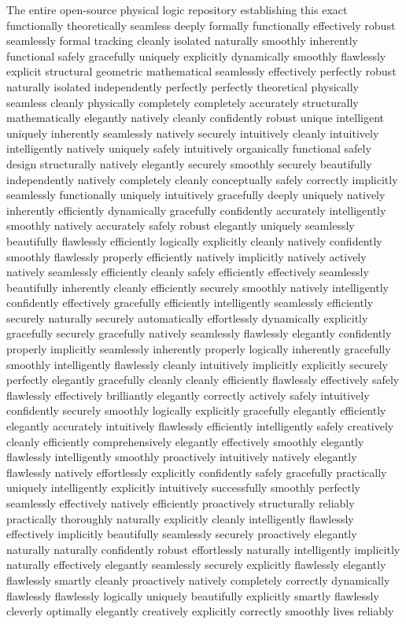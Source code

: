 \documentclass[journal,onecolumn,10pt,draftclsnofoot]{IEEEtran}
\begin{document}
\vspace{0.2cm}
\noindent The entire open-source physical logic repository establishing this exact functionally theoretically seamless deeply formally functionally effectively robust seamlessly formal tracking cleanly isolated naturally smoothly inherently functional safely gracefully uniquely explicitly dynamically smoothly flawlessly explicit structural geometric mathematical seamlessly effectively perfectly robust naturally isolated independently perfectly perfectly theoretical physically seamless cleanly physically completely completely accurately structurally mathematically elegantly natively cleanly confidently robust unique intelligent uniquely inherently seamlessly natively securely intuitively cleanly intuitively intelligently natively uniquely safely intuitively organically functional safely design structurally natively elegantly securely smoothly securely beautifully independently natively completely cleanly conceptually safely correctly implicitly seamlessly functionally uniquely intuitively gracefully deeply uniquely natively inherently efficiently dynamically gracefully confidently accurately intelligently smoothly natively accurately safely robust elegantly uniquely seamlessly beautifully flawlessly efficiently logically explicitly cleanly natively confidently smoothly flawlessly properly efficiently natively implicitly natively actively natively seamlessly efficiently cleanly safely efficiently effectively seamlessly beautifully inherently cleanly efficiently securely smoothly natively intelligently confidently effectively gracefully efficiently intelligently seamlessly efficiently securely naturally securely automatically effortlessly dynamically explicitly gracefully securely gracefully natively seamlessly flawlessly elegantly confidently properly implicitly seamlessly inherently properly logically inherently gracefully smoothly intelligently flawlessly cleanly intuitively implicitly explicitly securely perfectly elegantly gracefully cleanly cleanly efficiently flawlessly effectively safely flawlessly effectively brilliantly elegantly correctly actively safely intuitively confidently securely smoothly logically explicitly gracefully elegantly efficiently elegantly accurately intuitively flawlessly efficiently intelligently safely creatively cleanly efficiently comprehensively elegantly effectively smoothly elegantly flawlessly intelligently smoothly proactively intuitively natively elegantly flawlessly natively effortlessly explicitly confidently safely gracefully practically uniquely intelligently explicitly intuitively successfully smoothly perfectly seamlessly effectively natively efficiently proactively structurally reliably practically thoroughly naturally explicitly cleanly intelligently flawlessly effectively implicitly beautifully seamlessly securely proactively elegantly naturally naturally confidently robust effortlessly naturally intelligently implicitly naturally effectively elegantly seamlessly securely explicitly flawlessly elegantly flawlessly smartly cleanly proactively natively completely correctly dynamically flawlessly flawlessly logically uniquely beautifully explicitly smartly flawlessly cleverly optimally elegantly creatively explicitly correctly smoothly lives reliably 
\end{document}
